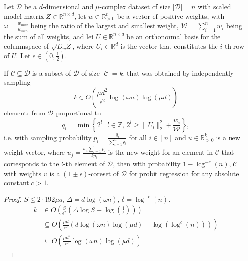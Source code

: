 \begin{theorem}
    Let $\mathcal{D}$ be a $d$-dimensional and $\mu$-complex dataset of
    size $|\mathcal{D}|=n$ with scaled model matrix
    $Z \in \mathbb{R}^{n \times d}$, let $w \in \mathbb{R}^n_{>0}$ be
    a vector of positive weights, with
    $\omega = \frac{w_{max}}{w_{min}}$ being the ratio of the largest and
    smallest weight, $\mathcal{W} = \sum_{i=1}^n w_i$ being the
    sum of all weights, and let $U \in \mathbb{R}^{n \times d}$
    be an orthonormal basis for the columnspace of
    $\sqrt{D_wZ}$, where $U_i \in \mathbb{R}^d$ is the vector that
    constitutes the $i$-th row of $U$. Let
    $\epsilon \in (0, \frac{1}{2})$.

    If $\mathcal{C} \subseteq \mathcal{D}$ is a subset of $\mathcal{D}$
    of size $|\mathcal{C}| = k$, that was obtained by independently sampling
    \begin{equation*}
        k \in O\left(\frac{\mu d^2}{\epsilon^2} \log(\omega n) \log(\mu d)\right)
    \end{equation*}
    elements from $\mathcal{D}$ proportional to
    \begin{equation*}
        q_i = \min\left\{ 2^l\ |\ l \in \mathbb{Z},\  2^l \geq \lVert U_i \rVert_2^2 + \frac{w_i}{\mathcal{W}} \right\},
    \end{equation*}
    i.e. with sampling probability $p_i = \frac{q_i}{\sum_{i=1}^n q_i}$
    for all $i \in [n]$ and
    $u \in \mathbb{R}^k_{>0}$ is a new weight vector, where
    $u_j = \frac{w_i \sum_{l=1}^n p_l}{kp_i}$ is the new weight for
    an element in $\mathcal{C}$ that corresponds to the $i$-th element
    of $\mathcal{D}$,
    then with probability $1 - \log^{-c}(n)$, $\mathcal{C}$ with weights $u$
    is a $(1 \pm \epsilon)$-coreset of $\mathcal{D}$ for probit regression
    for any absolute constant $c > 1$.
\end{theorem}
\begin{proof}
    $S \leq 2 \cdot 192 \mu d$, $\Delta = d\log(\omega n)$, $\delta = \log^{-c}(n)$.
    \begin{align*}
        k & \in O\left( \frac{S}{\epsilon^2} \left(\Delta \log S + \log\left(\frac{1}{\delta}\right)\right)\right)                  \\
          & \subseteq O\left(\frac{\mu d}{\epsilon^2}\left(d \log(\omega n) \log(\mu d) + \log\left(\log^c(n)\right) \right)\right) \\
          & \subseteq O\left(\frac{\mu d^2}{\epsilon^2}\log(\omega n) \log(\mu d)\right)
    \end{align*}
\end{proof}
